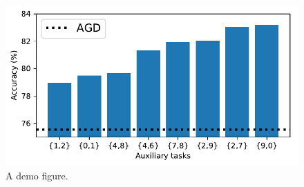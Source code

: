 \lipsum[3]

\begin{figure}[!ht]
   \centering
   \includegraphics[width=0.6\columnwidth]{figures/demo.pdf}
   \caption{A demo figure.}
   \label{fig:demo}
\end{figure}

\lipsum[4]

